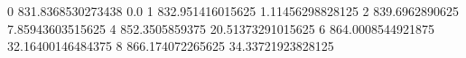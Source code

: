 0 831.8368530273438 0.0
1 832.951416015625 1.11456298828125
2 839.6962890625 7.85943603515625
4 852.3505859375 20.51373291015625
6 864.0008544921875 32.16400146484375
8 866.174072265625 34.33721923828125
